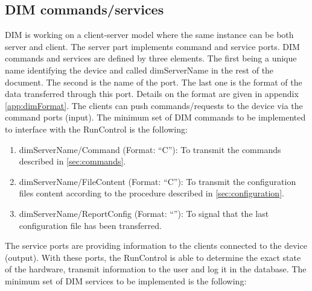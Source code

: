 \documentclass[a4paper]{article}
\begin{document}
\subsection{DIM commands/services} \label{sec:DIM}
DIM is working on a client-server model where the same instance can be both server and client.
The server part implements command and service ports. DIM commands and
services are defined by three elements. The first being a unique name
identifying the device and called dimServerName in the rest of the document.
The second is the name of the port. The last one is the format of the data
transferred through this port. Details on the format are given in appendix
\ref{app:dimFormat}. The clients can push commands/requests to the device via
the command ports (input). The minimum set of DIM commands to be implemented to
interface with the RunControl is the following:
\begin{enumerate}[label=\textbf{CMD.\arabic*}]
	\item \label{cmd:command} dimServerName/Command (Format: ``C''): To transmit
	the commands described in \ref{sec:commands}.
	\item \label{cmd:fileContent} dimServerName/FileContent (Format: ``C''): To
	transmit the configuration files content according to the procedure described
	in \ref{sec:configuration}.
	\item \label{cmd:report} dimServerName/ReportConfig (Format: ``''): To signal
	that the last configuration file has been transferred.
\end{enumerate}
The service ports are providing information to the clients connected to the device (output).
With these ports, the RunControl is able to determine the exact state of the hardware,
transmit information to the user and log it in the database. The minimum set of DIM services to
be implemented is the following:
\end{document}
